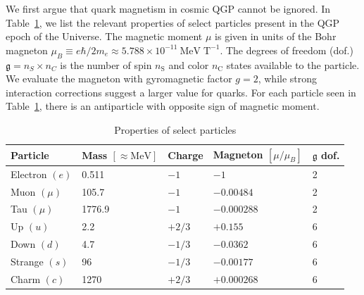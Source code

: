 \documentclass[epjST]{svjour}
\begin{document}
We first argue that quark magnetism in cosmic QGP cannot be ignored. In Table~\ref{tab:particle_properties}, we list the relevant properties of select particles present in the QGP epoch of the Universe. The magnetic moment \(\mu\) is given in units of the Bohr magneton \(\mu_{B}\equiv e\hbar/2m_{e}\approx5.788\times10^{-11}\ \mathrm{MeV\;T}^{-1}\). The degrees of freedom (dof.) \(\mathfrak{g}=n_{S}\times n_{C}\) is the number of spin \(n_\mathrm{S}\) and color \(n_\mathrm{C}\) states available to the particle. We evaluate the magneton with gyromagnetic factor \(g=2\), while strong interaction corrections suggest a larger value for quarks. For each particle seen in Table~\ref{tab:particle_properties}, there is an antiparticle with opposite sign of magnetic moment. 
\begin{table}[h]
\centering
\caption{Properties of select particles}
\label{tab:particle_properties}
\begin{tabular}{@{}lllll@{}}
\toprule
\textbf{Particle} & \textbf{Mass} \([\approx\mathrm{MeV}]\) & \textbf{Charge} & \textbf{Magneton} \([\mu/\mu_{B}]\) & \(\mathfrak{g}\) \textbf{dof.} \\ 
\midrule
Electron \((e)\) & 0.511 & \(-1\) & \(-1\) & 2 \\
Muon \((\mu)\) & 105.7 & \(-1\) & \(-0.00484\) & 2 \\
Tau \((\mu)\) & 1776.9 & \(-1\) & \(-0.000288\) & 2 \\
\midrule
Up \((u)\) & 2.2 & \(+2/3\) & \(+0.155\) & 6 \\
Down \((d)\) & 4.7 & \(-1/3\) & \(-0.0362\) & 6 \\
Strange \((s)\) & 96 & \(-1/3\) & \(-0.00177\) & 6 \\
Charm \((c)\) & 1270 & \(+2/3\) & \(+0.000268\) & 6 \\ 
\bottomrule
\end{tabular}
\end{table}
\end{document}
